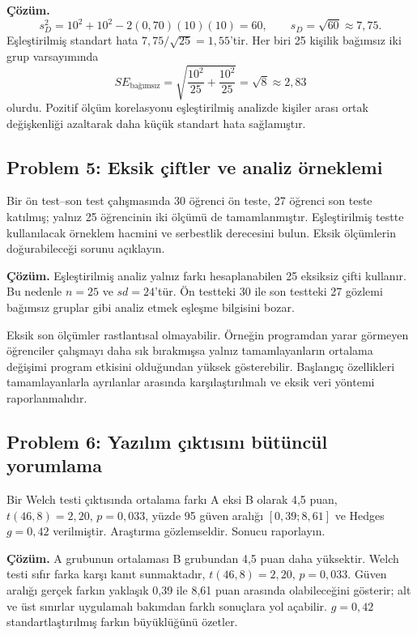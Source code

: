 \textbf{Çözüm.}
\[
s_D^2=10^2+10^2-2(0{,}70)(10)(10)=60,
\qquad s_D=\sqrt{60}\approx7{,}75.
\]
Eşleştirilmiş standart hata $7{,}75/\sqrt{25}=1{,}55$'tir. Her biri 25
kişilik bağımsız iki grup varsayımında
\[
SE_{\text{bağımsız}}
=\sqrt{\frac{10^2}{25}+\frac{10^2}{25}}
=\sqrt8\approx2{,}83
\]
olurdu. Pozitif ölçüm korelasyonu eşleştirilmiş analizde kişiler arası ortak
değişkenliği azaltarak daha küçük standart hata sağlamıştır.

\subsection*{Problem 5: Eksik çiftler ve analiz örneklemi}

Bir ön test--son test çalışmasında 30 öğrenci ön teste, 27 öğrenci son teste
katılmış; yalnız 25 öğrencinin iki ölçümü de tamamlanmıştır. Eşleştirilmiş
testte kullanılacak örneklem hacmini ve serbestlik derecesini bulun. Eksik
ölçümlerin doğurabileceği sorunu açıklayın.

\textbf{Çözüm.} Eşleştirilmiş analiz yalnız farkı hesaplanabilen 25 eksiksiz
çifti kullanır. Bu nedenle $n=25$ ve $sd=24$'tür. Ön testteki 30 ile son
testteki 27 gözlemi bağımsız gruplar gibi analiz etmek eşleşme bilgisini
bozar.

Eksik son ölçümler rastlantısal olmayabilir. Örneğin programdan yarar
görmeyen öğrenciler çalışmayı daha sık bırakmışsa yalnız tamamlayanların
ortalama değişimi program etkisini olduğundan yüksek gösterebilir. Başlangıç
özellikleri tamamlayanlarla ayrılanlar arasında karşılaştırılmalı ve eksik
veri yöntemi raporlanmalıdır.

\subsection*{Problem 6: Yazılım çıktısını bütüncül yorumlama}

Bir Welch testi çıktısında ortalama farkı A eksi B olarak 4,5 puan,
$t(46{,}8)=2{,}20$, $p=0{,}033$, yüzde 95 güven aralığı
$[0{,}39;8{,}61]$ ve Hedges $g=0{,}42$ verilmiştir. Araştırma gözlemseldir.
Sonucu raporlayın.

\textbf{Çözüm.} A grubunun ortalaması B grubundan 4,5 puan daha yüksektir.
Welch testi sıfır farka karşı kanıt sunmaktadır,
$t(46{,}8)=2{,}20$, $p=0{,}033$. Güven aralığı gerçek farkın yaklaşık 0,39
ile 8,61 puan arasında olabileceğini gösterir; alt ve üst sınırlar uygulamalı
bakımdan farklı sonuçlara yol açabilir. $g=0{,}42$ standartlaştırılmış farkın
büyüklüğünü özetler.

